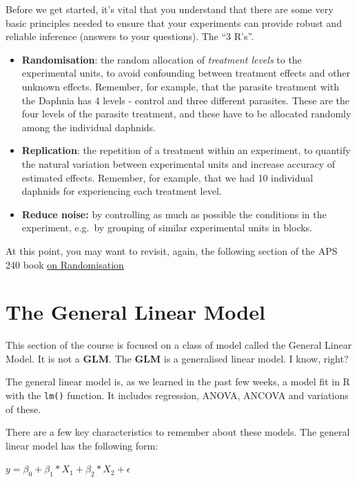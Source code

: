 \documentclass[
]{book}
\providecommand{\tightlist}{%
  \setlength{\itemsep}{0pt}\setlength{\parskip}{0pt}}
\begin{document}
Before we get started, it's vital that you understand that there are some very basic principles needed to ensure that your experiments can provide robust and reliable inference (answers to your questions). The ``3 R's''.

\begin{itemize}
\tightlist
\item
  \textbf{Randomisation}: the random allocation of \emph{treatment levels} to the experimental units, to avoid confounding between treatment effects and other unknown effects. Remember, for example, that the parasite treatment with the Daphnia has 4 levels - control and three different parasites. These are the four levels of the parasite treatment, and these have to be allocated randomly among the individual daphnids.
\item
  \textbf{Replication}: the repetition of a treatment within an experiment, to quantify the natural variation between experimental units and increase accuracy of estimated effects. Remember, for example, that we had 10 individual daphnids for experiencing each treatment level.
\item
  \textbf{Reduce noise:} by controlling as much as possible the conditions in the experiment, e.g.~by grouping of similar experimental units in blocks.
\end{itemize}

At this point, you may want to revisit, again, the following section of the APS 240 book \href{https://dzchilds.github.io/stats-for-bio/principles-experimental-design.html\#randomisation}{on Randomisation}

\section{The General Linear Model}\label{the-general-linear-model}

This section of the course is focused on a class of model called the General Linear Model. It is not a \textbf{GLM}. The \textbf{GLM} is a generalised linear model. I know, right?

The general linear model is, as we learned in the past few weeks, a model fit in R with the \texttt{lm()} function. It includes regression, ANOVA, ANCOVA and variations of these.

There are a few key characteristics to remember about these models. The general linear model has the following form:

\(y = \beta_{0}+\beta_{1}*X_{1}+\beta_{2}*X_{2}+\epsilon\)
\end{document}
